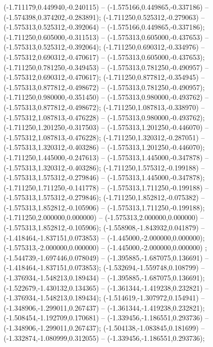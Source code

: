  (-1.711179,0.449940,-0.240115) -- (-1.575166,0.449865,-0.337186) -- (-1.574398,0.374202,-0.283891);
 (-1.711250,0.525312,-0.279063) -- (-1.575313,0.525312,-0.392064) -- (-1.575166,0.449865,-0.337186);
 (-1.711250,0.605000,-0.311513) -- (-1.575313,0.605000,-0.437653) -- (-1.575313,0.525312,-0.392064);
 (-1.711250,0.690312,-0.334976) -- (-1.575312,0.690312,-0.470617) -- (-1.575313,0.605000,-0.437653);
 (-1.711250,0.781250,-0.349453) -- (-1.575313,0.781250,-0.490957) -- (-1.575312,0.690312,-0.470617);
 (-1.711250,0.877812,-0.354945) -- (-1.575313,0.877812,-0.498672) -- (-1.575313,0.781250,-0.490957);
 (-1.711250,0.980000,-0.351450) -- (-1.575313,0.980000,-0.493762) -- (-1.575313,0.877812,-0.498672);
 (-1.711250,1.087813,-0.338970) -- (-1.575312,1.087813,-0.476228) -- (-1.575313,0.980000,-0.493762);
 (-1.711250,1.201250,-0.317503) -- (-1.575313,1.201250,-0.446070) -- (-1.575312,1.087813,-0.476228);
 (-1.711250,1.320312,-0.287051) -- (-1.575313,1.320312,-0.403286) -- (-1.575313,1.201250,-0.446070);
 (-1.711250,1.445000,-0.247613) -- (-1.575313,1.445000,-0.347878) -- (-1.575313,1.320312,-0.403286);
 (-1.711250,1.575312,-0.199188) -- (-1.575313,1.575312,-0.279846) -- (-1.575313,1.445000,-0.347878);
 (-1.711250,1.711250,-0.141778) -- (-1.575313,1.711250,-0.199188) -- (-1.575313,1.575312,-0.279846);
 (-1.711250,1.852812,-0.075382) -- (-1.575313,1.852812,-0.105906) -- (-1.575313,1.711250,-0.199188);
 (-1.711250,2.000000,0.000000) -- (-1.575313,2.000000,0.000000) -- (-1.575313,1.852812,-0.105906);
 (-1.558908,-1.843932,0.041879) -- (-1.418464,-1.837151,0.073853) -- (-1.445000,-2.000000,0.000000);
 (-1.575313,-2.000000,0.000000) -- (-1.445000,-2.000000,0.000000) ;
 (-1.544739,-1.697446,0.078049) -- (-1.395885,-1.687075,0.136691) -- (-1.418464,-1.837151,0.073853);
 (-1.532694,-1.559748,0.108799) -- (-1.376934,-1.548213,0.189434) -- (-1.395885,-1.687075,0.136691);
 (-1.522679,-1.430132,0.134365) -- (-1.361344,-1.419238,0.232821) -- (-1.376934,-1.548213,0.189434);
 (-1.514619,-1.307972,0.154941) -- (-1.348906,-1.299011,0.267437) -- (-1.361344,-1.419238,0.232821);
 (-1.508454,-1.192709,0.170681) -- (-1.339456,-1.186551,0.293736) -- (-1.348906,-1.299011,0.267437);
 (-1.504138,-1.083845,0.181699) -- (-1.332874,-1.080999,0.312055) -- (-1.339456,-1.186551,0.293736);
